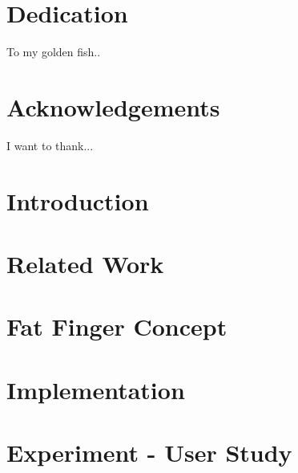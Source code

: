 \documentclass[10pt,twoside]{report}
\begin{document}
\cleardoublepage


\chapter*{Dedication}
To my golden fish..
\cleardoublepage


\chapter*{Acknowledgements}
I want to thank...
\cleardoublepage

\tableofcontents
\cleardoublepage

\listoffigures
\cleardoublepage

\listoftables
\cleardoublepage


\pagestyle{fancy}

\chapter{Introduction}
\label{sec:Introduction}

\cleardoublepage

\chapter{Related Work}
\label{sec:RelatedWork}

\cleardoublepage

\chapter{Fat Finger Concept}
\label{sec:FatFingerConcept}

\cleardoublepage

\chapter{Implementation}
\label{sec:Implementation}

\cleardoublepage

\chapter{Experiment - User Study}
\label{sec:Experiment}

\cleardoublepage
\end{document}
